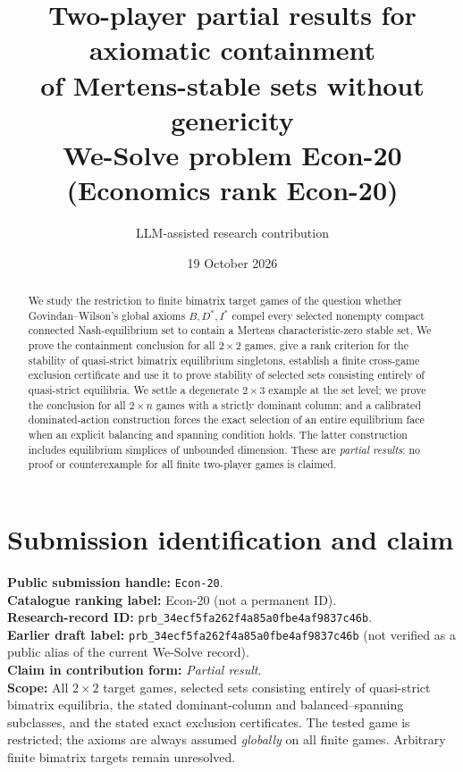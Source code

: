 \documentclass[11pt]{article}
\title{Two-player partial results for axiomatic containment\\
 of Mertens-stable sets without genericity\\[4pt]
 \large We-Solve problem Econ-20 (Economics rank Econ-20)}
\author{LLM-assisted research contribution}
\date{19 October 2026}
\theoremstyle{definition}
\theoremstyle{remark}
\begin{document}
\maketitle

\begin{abstract}
We study the restriction to finite bimatrix target games of the question
whether Govindan--Wilson's global axioms $B,D^*,I^*$ compel every
selected nonempty compact connected Nash-equilibrium set to contain a
Mertens characteristic-zero stable set. We prove the containment
conclusion for all $2\times2$ games, give a rank criterion for the
stability of quasi-strict bimatrix equilibrium singletons, establish a
finite cross-game exclusion certificate and use it to prove stability
of selected sets consisting entirely of quasi-strict equilibria. We
settle a degenerate $2\times3$ example at the set level; we prove the
conclusion for all $2\times n$ games with a strictly dominant column;
and a calibrated dominated-action construction forces the exact
selection of an entire equilibrium face when an explicit balancing and
spanning condition holds. The latter construction includes equilibrium
simplices of unbounded dimension. These are \emph{partial results}:
no proof or counterexample for all finite two-player games is claimed.
\end{abstract}

\section*{Submission identification and claim}\label{sec:metadata}
\noindent\textbf{Public submission handle:} \texttt{Econ-20}.\\
\textbf{Catalogue ranking label:} Econ-20 (not a permanent ID).\\
\textbf{Research-record ID:} \texttt{prb\_34ecf5fa262f4a85a0fbe4af9837c46b}.\\
\textbf{Earlier draft label:} \texttt{prb\_34ecf5fa262f4a85a0fbe4af9837c46b} (not verified as a
public alias of the current We-Solve record).\\
\textbf{Claim in contribution form:} \emph{Partial result}.\\
\textbf{Scope:} All $2\times2$ target games, selected sets consisting
entirely of quasi-strict bimatrix equilibria, the stated dominant-column
and balanced--spanning subclasses, and the stated exact exclusion
certificates. The tested game is restricted; the axioms are always
assumed \emph{globally} on all finite games. Arbitrary finite bimatrix
targets remain unresolved.
\end{document}
